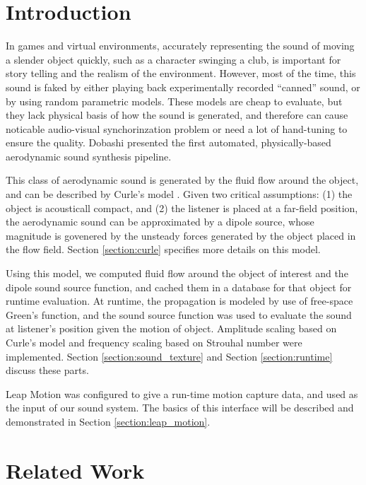 \documentclass[tog]{acmsiggraph}
\begin{document}
\keywordlist


\copyrightspace


\section{Introduction} 

In games and virtual environments, accurately representing the sound of moving a slender object quickly, such as a character swinging a club, is important for story telling and the realism of the environment. However, most of the time, this sound is faked by either playing back experimentally recorded ``canned'' sound, or by using random parametric models. These models are cheap to evaluate, but they lack physical basis of how the sound is generated, and therefore can cause noticable audio-visual synchorinzation problem or need a lot of hand-tuning to ensure the quality. Dobashi \cite{dobashi2003} presented the first automated, physically-based aerodynamic sound synthesis pipeline.

This class of aerodynamic sound is generated by the fluid flow around the object, and can be described by Curle's model \cite{curle, howe2002}. Given two critical assumptions: (1) the object is acousticall compact, and (2) the listener is placed at a far-field position, the aerodynamic sound can be approximated by a dipole source, whose magnitude is govenered by the unsteady forces generated by the object placed in the flow field. Section \ref{section:curle} specifies more details on this model.

Using this model, we computed fluid flow around the object of interest and the dipole sound source function, and cached them in a database for that object for runtime evaluation. At runtime, the propagation is modeled by use of free-space Green's function, and the sound source function was used to evaluate the sound at listener's position given the motion of object. Amplitude scaling based on Curle's model and frequency scaling based on Strouhal number were implemented. Section \ref{section:sound_texture} and Section \ref{section:runtime} discuss these parts. 

Leap Motion was configured to give a run-time motion capture data, and used as the input of our sound system. The basics of this interface will be described and demonstrated in Section \ref{section:leap_motion}. 



\section{Related Work} 
\end{document}
